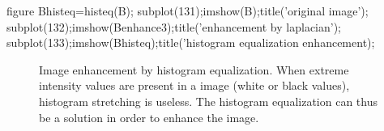 \begin{matlab}
figure
Bhisteq=histeq(B);
subplot(131);imshow(B);title('original image');
subplot(132);imshow(Benhance3);title('enhancement by laplacian');
subplot(133);imshow(Bhisteq);title('histogram equalization enhancement);
\end{matlab}

\begin{figure}[htbp]
\centering
 \hspace{1cm}

 \caption{Image enhancement by histogram equalization. When extreme intensity values are present in a image (white or black values), histogram stretching is useless. The histogram equalization can thus be a solution in order to enhance the image.}
 \label{fig:introduction:matlab:histeq}
\end{figure}

